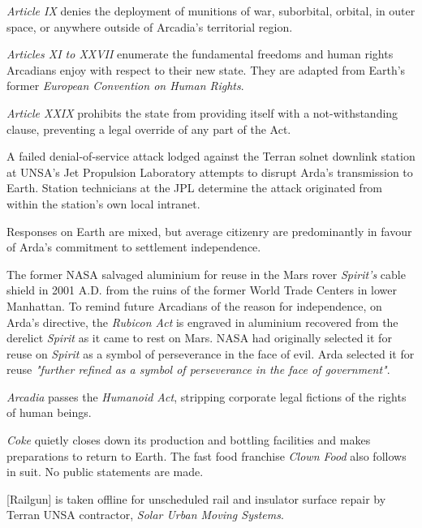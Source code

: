 \item {\it Article IX} denies the deployment of munitions of war, suborbital, orbital, in outer space, or anywhere outside of Arcadia's territorial region.

\item {\it Articles XI to XXVII} enumerate the fundamental freedoms and human rights Arcadians enjoy with respect to their new state. They are adapted from Earth's former {\it European Convention on Human Rights}.

\item {\it Article XXIX} prohibits the state from providing itself with a not-withstanding clause, preventing a legal override of any part of the Act.
\stopitemize
\stopTimelineDocument

A failed denial-of-service attack lodged against the Terran solnet downlink station at UNSA's Jet Propulsion Laboratory attempts to disrupt Arda's transmission to Earth. Station technicians at the JPL determine the attack originated from within the station's own local intranet. 

Responses on Earth are mixed, but average citizenry are predominantly in favour of Arda's commitment to settlement independence.
\StopTimelineDate

The former NASA salvaged aluminium for reuse in the Mars rover {\it Spirit's} cable shield in 2001 A.D. from the ruins of the former World Trade Centers in lower Manhattan. To remind future Arcadians of the reason for independence, on Arda's directive, the {\it Rubicon Act} is engraved in aluminium recovered from the derelict {\it Spirit} as it came to rest on Mars. NASA had originally selected it for reuse on {\it Spirit} as a symbol of perseverance in the face of evil. Arda selected it for reuse {\it "further refined as a symbol of perseverance in the face of government"}.
\StopTimelineDate

{\it Arcadia} passes the {\it Humanoid Act}, stripping corporate legal fictions of the rights of human beings.
\StopTimelineDate

{\it Coke} quietly closes down its production and bottling facilities and makes preparations to return to Earth. The fast food franchise {\it Clown Food} also follows in suit. No public statements are made.
\StopTimelineDate


[Railgun] is taken offline for unscheduled rail and insulator surface repair by Terran UNSA contractor, {\it Solar Urban Moving Systems}.
\StopTimelineDate

